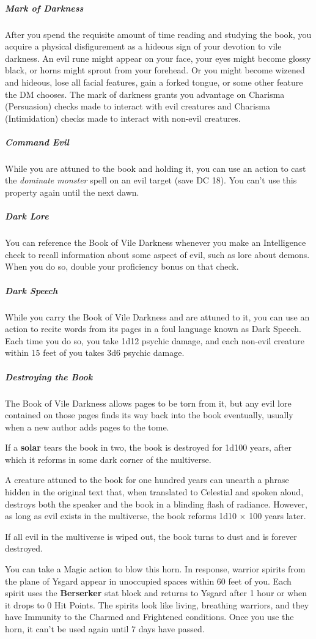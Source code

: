 \documentclass[10pt,a4paper,twoside,bg=print,twocolumn,openany,nodeprecatedcode]{dndarticle}
\begin{document}
\subparagraph{Mark of Darkness}
After you spend the requisite amount of time reading and studying the book, you acquire a physical disfigurement as a hideous sign of your devotion to vile darkness. An evil rune might appear on your face, your eyes might become glossy black, or horns might sprout from your forehead. Or you might become wizened and hideous, lose all facial features, gain a forked tongue, or some other feature the DM chooses. The mark of darkness grants you advantage on Charisma (Persuasion) checks made to interact with evil creatures and Charisma (Intimidation) checks made to interact with non-evil creatures.

\subparagraph{Command Evil}
While you are attuned to the book and holding it, you can use an action to cast the \textit{dominate monster} spell on an evil target (save DC 18). You can't use this property again until the next dawn.

\subparagraph{Dark Lore}
You can reference the Book of Vile Darkness whenever you make an Intelligence check to recall information about some aspect of evil, such as lore about demons. When you do so, double your proficiency bonus on that check.

\subparagraph{Dark Speech}
While you carry the Book of Vile Darkness and are attuned to it, you can use an action to recite words from its pages in a foul language known as Dark Speech. Each time you do so, you take 1d12 psychic damage, and each non-evil creature within 15 feet of you takes 3d6 psychic damage.

\subparagraph{Destroying the Book}
The Book of Vile Darkness allows pages to be torn from it, but any evil lore contained on those pages finds its way back into the book eventually, usually when a new author adds pages to the tome.

If a \textbf{solar} tears the book in two, the book is destroyed for 1d100 years, after which it reforms in some dark corner of the multiverse.

A creature attuned to the book for one hundred years can unearth a phrase hidden in the original text that, when translated to Celestial and spoken aloud, destroys both the speaker and the book in a blinding flash of radiance. However, as long as evil exists in the multiverse, the book reforms 1d10 × 100 years later.

If all evil in the multiverse is wiped out, the book turns to dust and is forever destroyed.

You can take a Magic action to blow this horn. In response, warrior spirits from the plane of Ysgard appear in unoccupied spaces within 60 feet of you. Each spirit uses the \textbf{Berserker} stat block and returns to Ysgard after 1 hour or when it drops to 0 Hit Points. The spirits look like living, breathing warriors, and they have Immunity to the Charmed and Frightened conditions. Once you use the horn, it can't be used again until 7 days have passed.
\end{document}
